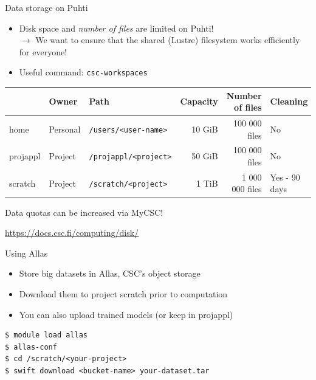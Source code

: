 \documentclass[aspectratio=1610,14pt]{beamer}
\newcommand{\link}[1]{\alert{\url{#1}}}
\begin{document}
\begin{frame}{Data storage on Puhti}

  \begin{itemize}
  \item Disk space and \emph{number of files} are limited on Puhti! \\
    {\small $\rightarrow$ We want to ensure that the shared (Lustre) filesystem works
    efficiently for everyone!}
  \item Useful command: {\tt csc-workspaces}
  \end{itemize}

  \vfill

  {\footnotesize
    \begin{tabular}{lllrrl}
             & Owner    & Path                      & Capacity & Number of files & Cleaning \\
    \hline
    home     & Personal & {\tt /users/<user-name>}  & 10 GiB   & 100 000 files   & No \\
    projappl & Project  & {\tt /projappl/<project>} & 50 GiB   & 100 000 files   & No \\
    scratch  & Project  & {\tt /scratch/<project>}  & 1 TiB    & 1 000 000 files & Yes - 90 days \\
    \end{tabular}
  }
  \vfill
  {\small
    Data quotas can be increased via MyCSC!

    \link{https://docs.csc.fi/computing/disk/}}
\end{frame}

\begin{frame}[fragile]{Using Allas}
  \begin{itemize}
  \item Store big datasets in Allas, CSC's object storage
  \item Download them to project scratch prior to computation
  \item You can also upload trained models (or keep in projappl)
  \end{itemize}

  \vfill
  
\begin{verbatim}
$ module load allas
$ allas-conf
$ cd /scratch/<your-project>
$ swift download <bucket-name> your-dataset.tar  
\end{verbatim}
\end{frame}
\end{document}
